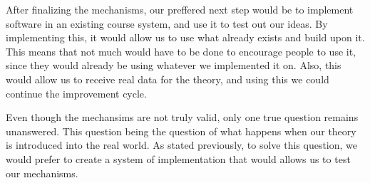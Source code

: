 \documentclass[12pt, Arial]{article}
\begin{document}
After finalizing the mechanisms, our preffered next step would be to implement software in an existing course system, and use it to test out our ideas. By implementing this, it would allow us to use what already exists and build upon it. This means that not much would have to be done to encourage people to use it, since they would already be using whatever we implemented it on. Also, this would allow us to receive real data for the theory, and using this we could continue the improvement cycle.

Even though the mechansims are not truly valid, only one true question remains unanswered. This question being the question of what happens when our theory is introduced into the real world. As stated previously, to solve this question, we would prefer to create a system of implementation that would allows us to test our mechanisms.
{}

\end{document}
